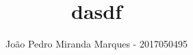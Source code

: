 \documentclass[10pt]{article}
\author{João Pedro Miranda Marques - 2017050495}
\begin{document}
\title{dasdf}



\maketitle









\printbibliography
\end{document}
